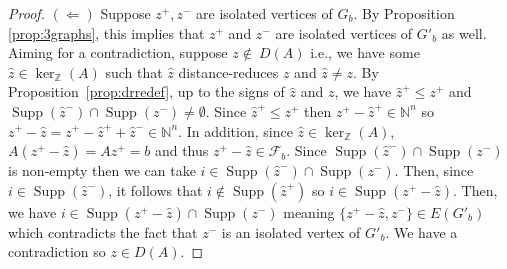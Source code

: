 \documentclass[a4paper, 12pt]{article}
\newcommand{\NN}{\mathbb N}
\newcommand{\ZZ}{\mathbb Z}
\theoremstyle{plain}
\theoremstyle{definition}
\theoremstyle{remark}
\begin{document}
\begin{proof}
    \smallskip
    $(\Longleftarrow)$ Suppose $z^+,z^-$ are isolated vertices of $G_b$. By Proposition \ref{prop:3graphs}, this implies that $z^+$ and $z^-$ are isolated vertices of $G'_b$ as well. Aiming for a contradiction, suppose $z \notin\ D(A)$ i.e., we have some $\hat z \in \ker_\ZZ(A)$ such that $\hat z$ distance-reduces $z$ and $\hat z \neq z$. By Proposition~\ref{prop:drredef}, up to the signs of $\hat z$ and $z$, we have $\hat z^+ \le z^+$ and $\operatorname{Supp}(\hat z^-) \cap \operatorname{Supp}(z^-)\neq \emptyset$. Since $\hat z^+ \le z^+$ then $z^+-\hat z^+ \in \NN^n$ so $z^+-\hat z=z^+-\hat z^++\hat z^- \in \NN^n$. In addition, since $\hat z \in \ker_\ZZ(A)$, $A(z^+-\hat z)=Az^+=b$ and thus $z^+-\hat z \in \mathcal{F}_b$. Since $\operatorname{Supp}(\hat z^-) \cap \operatorname{Supp}(z^-)$ is non-empty then we can take $i \in \operatorname{Supp}(\hat z^-) \cap \operatorname{Supp}(z^-)$. Then, since $i \in \operatorname{Supp}(\hat z^-)$, it follows that $i \not\in \operatorname{Supp}(\hat z^+)$ so $i \in \operatorname{Supp}(z^+-\hat z)$. Then, we have $i \in \operatorname{Supp}(z^+-\hat z) \cap \operatorname{Supp}(z^-)$ meaning $\{z^+-\hat z,z^-\} \in E(G'_b)$ which contradicts the fact that $z^-$ is an isolated vertex of $G'_b$. We have a contradiction so $z \in D(A)$.
    

    
    
\end{proof}
\end{document}
